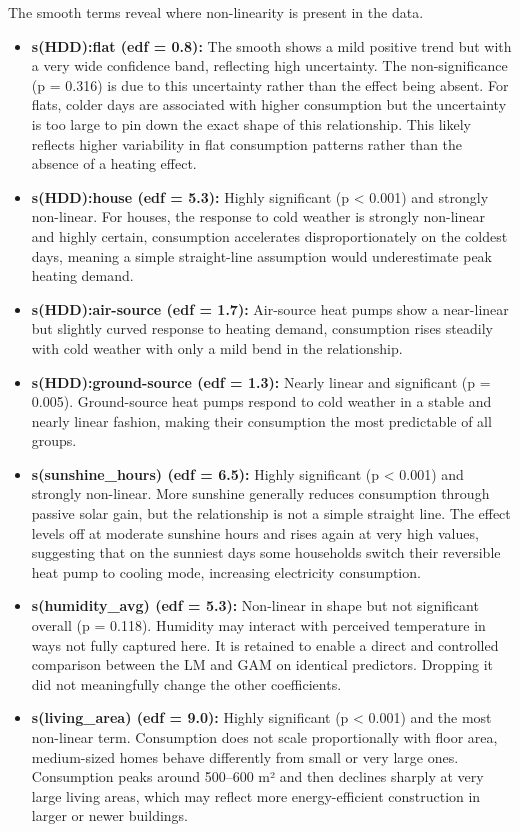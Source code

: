 \documentclass[
]{article}
\providecommand{\tightlist}{%
  \setlength{\itemsep}{0pt}\setlength{\parskip}{0pt}}
\begin{document}
The smooth terms reveal where non-linearity is present in the data.

\begin{itemize}
\tightlist
\item
  \textbf{s(HDD):flat (edf = 0.8):} The smooth shows a mild positive
  trend but with a very wide confidence band, reflecting high
  uncertainty. The non-significance (p = 0.316) is due to this
  uncertainty rather than the effect being absent. For flats, colder
  days are associated with higher consumption but the uncertainty is too
  large to pin down the exact shape of this relationship. This likely
  reflects higher variability in flat consumption patterns rather than
  the absence of a heating effect.
\item
  \textbf{s(HDD):house (edf = 5.3):} Highly significant (p \textless{}
  0.001) and strongly non-linear. For houses, the response to cold
  weather is strongly non-linear and highly certain, consumption
  accelerates disproportionately on the coldest days, meaning a simple
  straight-line assumption would underestimate peak heating demand.
\item
  \textbf{s(HDD):air-source (edf = 1.7):} Air-source heat pumps show a
  near-linear but slightly curved response to heating demand,
  consumption rises steadily with cold weather with only a mild bend in
  the relationship.
\item
  \textbf{s(HDD):ground-source (edf = 1.3):} Nearly linear and
  significant (p = 0.005). Ground-source heat pumps respond to cold
  weather in a stable and nearly linear fashion, making their
  consumption the most predictable of all groups.
\item
  \textbf{s(sunshine\_hours) (edf = 6.5):} Highly significant (p
  \textless{} 0.001) and strongly non-linear. More sunshine generally
  reduces consumption through passive solar gain, but the relationship
  is not a simple straight line. The effect levels off at moderate
  sunshine hours and rises again at very high values, suggesting that on
  the sunniest days some households switch their reversible heat pump to
  cooling mode, increasing electricity consumption.
\item
  \textbf{s(humidity\_avg) (edf = 5.3):} Non-linear in shape but not
  significant overall (p = 0.118). Humidity may interact with perceived
  temperature in ways not fully captured here. It is retained to enable
  a direct and controlled comparison between the LM and GAM on identical
  predictors. Dropping it did not meaningfully change the other
  coefficients.
\item
  \textbf{s(living\_area) (edf = 9.0):} Highly significant (p
  \textless{} 0.001) and the most non-linear term. Consumption does not
  scale proportionally with floor area, medium-sized homes behave
  differently from small or very large ones. Consumption peaks around
  500--600 m² and then declines sharply at very large living areas,
  which may reflect more energy-efficient construction in larger or
  newer buildings.
\end{itemize}
\end{document}
